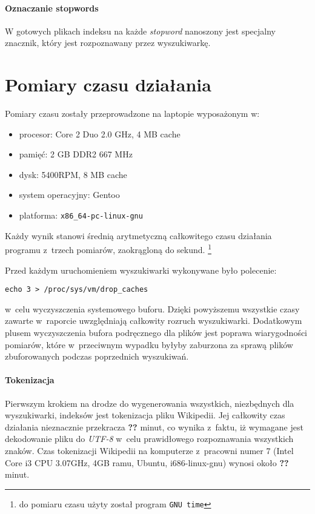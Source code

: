 \documentclass[a4paper,12pt]{article}
\begin{document}
\paragraph{Oznaczanie stopwords} W gotowych plikach indeksu na każde
\textit{stopword} nanoszony jest specjalny znacznik, który jest rozpoznawany
przez wyszukiwarkę.

\section{Pomiary czasu działania}
Pomiary czasu zostały przeprowadzone na laptopie wyposażonym w:
\begin{itemize}
  \item procesor: Core 2 Duo 2.0 GHz, 4 MB cache
  \item pamięć: 2 GB DDR2 667 MHz
  \item dysk: 5400RPM, 8 MB cache
  \item system operacyjny: Gentoo
  \item platforma: \texttt{x86\_64-pc-linux-gnu}
\end{itemize}
Każdy wynik stanowi średnią arytmetyczną całkowitego czasu działania programu
z~trzech pomiarów, zaokrągloną do sekund.
\footnote{do pomiaru czasu użyty został program \texttt{GNU time}}

Przed każdym uruchomieniem wyszukiwarki wykonywane było polecenie:
\begin{verbatim}
echo 3 > /proc/sys/vm/drop_caches
\end{verbatim}
w~celu wyczyszczenia systemowego buforu. Dzięki powyższemu wszystkie czasy zawarte
w~raporcie uwzględniają całkowity rozruch wyszukiwarki. Dodatkowym plusem
wyczyszczenia bufora podręcznego dla plików jest poprawa wiarygodności
pomiarów, które w~przeciwnym wypadku byłyby zaburzona za sprawą plików
zbuforowanych podczas poprzednich wyszukiwań.

\paragraph{Tokenizacja}
Pierwszym krokiem na drodze do wygenerowania wszystkich, niezbędnych dla
wyszukiwarki, indeksów jest tokenizacja pliku Wikipedii. Jej całkowity czas
działania nieznacznie przekracza \textbf{??} minut, co wynika z~faktu, iż wymagane jest
dekodowanie pliku do \textit{UTF-8} w~celu prawidłowego rozpoznawania
wszystkich znaków. Czas tokenizacji Wikipedii na komputerze z~pracowni numer 7
(Intel Core i3 CPU 3.07GHz, 4GB ramu, Ubuntu, i686-linux-gnu) wynosi około \textbf{??}
minut.
\end{document}

